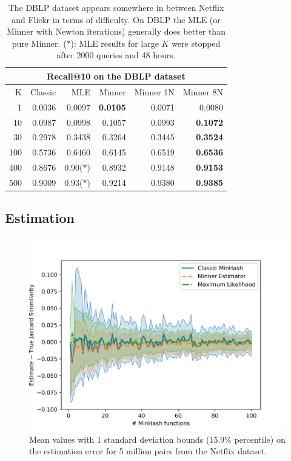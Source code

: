 \begin{table}
\centering
 \begin{tabular}{|r| r r r r r|} 
 \hline
     \multicolumn{6}{|c|}{Recall@10 on the DBLP dataset} \\
 \hline
 K  & Classic & MLE & Minner & Minner 1N & Minner 8N \\
 \hline
    1 & 0.0036 & 0.0097 & \textbf{ 0.0105} & 0.0071 & 0.0080 \\
  10 & 0.0987 & 0.0998 & 0.1057 & 0.0993 & \textbf{ 0.1072} \\
  30 & 0.2978 & 0.3438 & 0.3264 & 0.3445 & \textbf{ 0.3524} \\
 100 & 0.5736 & 0.6460 & 0.6145 & 0.6519 & \textbf{ 0.6536} \\
 400 & 0.8676 & 0.90($\ast$) & 0.8932 & 0.9148 & \textbf{ 0.9153} \\
 500 & 0.9009 & 0.93($\ast$) & 0.9214 & 0.9380 & \textbf{ 0.9385} \\
  \hline
 \end{tabular}
 \caption{The DBLP dataset appears somewhere in between Netflix and Flickr in terms of difficulty.
    On DBLP the MLE (or Minner with Newton iterations) generally does better than pure Minner.
   ($\ast$): MLE results for large $K$ were stopped after 2000 queries and 48 hours.
 }
 \label{tab:dblp}
\end{table}

\subsection{Estimation}\label{sec:estimation}

\begin{figure}
   \centering
   \includegraphics[trim=0 0 35 40,clip,width=\linewidth]{figures/var2}
   \caption{
      Mean values with 1 standard deviation bounds (15.9\% percentile)
      on the estimation error for 5 million pairs from the Netflix dataset.
   }
   \label{fig:var}
\end{figure}

